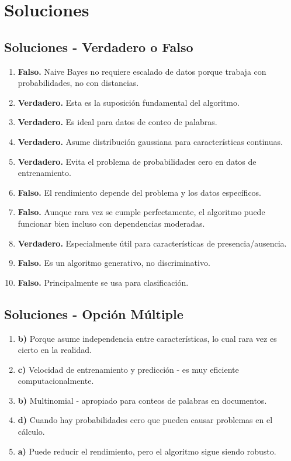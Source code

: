 \documentclass[12pt]{article}
\begin{document}
\section{Soluciones}

\subsection{Soluciones - Verdadero o Falso}

\begin{enumerate}
    \item \textbf{Falso.} Naive Bayes no requiere escalado de datos porque trabaja con probabilidades, no con distancias.
    \item \textbf{Verdadero.} Esta es la suposición fundamental del algoritmo.
    \item \textbf{Verdadero.} Es ideal para datos de conteo de palabras.
    \item \textbf{Verdadero.} Asume distribución gaussiana para características continuas.
    \item \textbf{Verdadero.} Evita el problema de probabilidades cero en datos de entrenamiento.
    \item \textbf{Falso.} El rendimiento depende del problema y los datos específicos.
    \item \textbf{Falso.} Aunque rara vez se cumple perfectamente, el algoritmo puede funcionar bien incluso con dependencias moderadas.
    \item \textbf{Verdadero.} Especialmente útil para características de presencia/ausencia.
    \item \textbf{Falso.} Es un algoritmo generativo, no discriminativo.
    \item \textbf{Falso.} Principalmente se usa para clasificación.
\end{enumerate}

\subsection{Soluciones - Opción Múltiple}

\begin{enumerate}
    \item \textbf{b)} Porque asume independencia entre características, lo cual rara vez es cierto en la realidad.
    \item \textbf{c)} Velocidad de entrenamiento y predicción - es muy eficiente computacionalmente.
    \item \textbf{b)} Multinomial - apropiado para conteos de palabras en documentos.
    \item \textbf{d)} Cuando hay probabilidades cero que pueden causar problemas en el cálculo.
    \item \textbf{a)} Puede reducir el rendimiento, pero el algoritmo sigue siendo robusto.
\end{enumerate}
\end{document}
